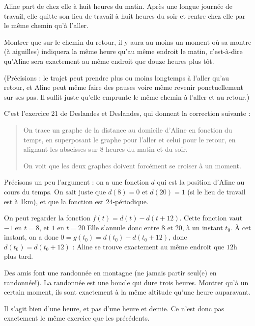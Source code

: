 \begin{exo}
Aline part de chez elle à huit heures du matin. Après une longue journée de travail, elle quitte son lieu de travail à huit heures du soir et rentre chez elle par le même chemin qu'à l'aller.

Montrer que sur le chemin du retour, il y aura au moins un moment où sa montre (à aiguilles) indiquera la même heure qu'au même endroit le matin, c'est-à-dire qu'Aline sera exactement au même endroit que douze heures plus tôt.

(Précisions : le trajet peut prendre plus ou moins longtemps à l'aller qu'au retour, et Aline peut même faire des pauses voire même revenir ponctuellement sur ses pas. Il suffit juste qu'elle emprunte le même chemin à l'aller et au retour.)
\begin{sol}

C'est l'exercice 21 de Deslandes et Deslandes, qui donnent la correction suivante :

\begin{quote}
On trace un graphe de la distance au domicile d'Aline en fonction du temps, en superposant le graphe pour l'aller et celui pour le retour, en alignant les abscisses sur $8$ heures du matin et du soir.

On voit que les deux graphes doivent forcément se croiser à un moment.
\end{quote}

Précisons un peu l'argument : on a une fonction $d$ qui est la position d'Aline au cours du temps. On sait juste que $d(8)=0$ et $d(20)=1$ (si le lieu de travail est à 1km), et que la fonction est $24$-périodique.

On peut regarder la fonction $f(t)=d(t)-d(t+12)$. Cette fonction vaut $-1$ en $t=8$, et $1$ en $t=20$ Elle s'annule donc entre $8$ et $20$, à un instant $t_0$. À cet instant, on a donc $0=g(t_0)=d(t_0)-d(t_0+12)$, donc $d(t_0)=d(t_0+12)$ : Aline se trouve exactement au même endroit que $12$h plus tard.
\end{sol}
\end{exo}



\begin{exo}[Randonnée]
Des amis font une randonnée en montagne (ne jamais partir seul(e) en randonnée!).
La randonnée est une boucle qui dure trois heures.
Montrer qu'à un certain moment, ils sont exactement à la même altitude qu'une heure auparavant.
\begin{hint}
Il s'agit bien d'une heure, et pas d'une heure et demie. Ce n'est donc pas exactement le même exercice que les précédents.
\end{hint}
\end{exo}


